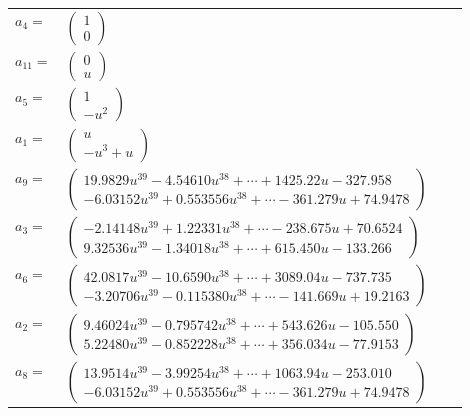 \documentclass[1p]{elsarticle_modified}
\theoremstyle{definition}
\begin{document}
\begin{tabular}{m{7pt} m{180pt} m{7pt} m{180pt} }
\flushright $a_{4}=$&$\begin{pmatrix}1\\0\end{pmatrix}$ \\
\flushright $a_{11}=$&$\begin{pmatrix}0\\u\end{pmatrix}$ \\
\flushright $a_{5}=$&$\begin{pmatrix}1\\- u^2\end{pmatrix}$ \\
\flushright $a_{1}=$&$\begin{pmatrix}u\\- u^3+u\end{pmatrix}$ \\
\flushright $a_{9}=$&$\begin{pmatrix}19.9829 u^{39}-4.54610 u^{38}+\cdots+1425.22 u-327.958\\-6.03152 u^{39}+0.553556 u^{38}+\cdots-361.279 u+74.9478\end{pmatrix}$ \\
\flushright $a_{3}=$&$\begin{pmatrix}-2.14148 u^{39}+1.22331 u^{38}+\cdots-238.675 u+70.6524\\9.32536 u^{39}-1.34018 u^{38}+\cdots+615.450 u-133.266\end{pmatrix}$ \\
\flushright $a_{6}=$&$\begin{pmatrix}42.0817 u^{39}-10.6590 u^{38}+\cdots+3089.04 u-737.735\\-3.20706 u^{39}-0.115380 u^{38}+\cdots-141.669 u+19.2163\end{pmatrix}$ \\
\flushright $a_{2}=$&$\begin{pmatrix}9.46024 u^{39}-0.795742 u^{38}+\cdots+543.626 u-105.550\\5.22480 u^{39}-0.852228 u^{38}+\cdots+356.034 u-77.9153\end{pmatrix}$ \\
\flushright $a_{8}=$&$\begin{pmatrix}13.9514 u^{39}-3.99254 u^{38}+\cdots+1063.94 u-253.010\\-6.03152 u^{39}+0.553556 u^{38}+\cdots-361.279 u+74.9478\end{pmatrix}$ \\

\end{tabular}
\end{document}

